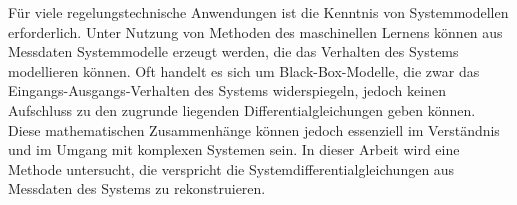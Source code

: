 Für viele regelungstechnische Anwendungen ist die Kenntnis von Systemmodellen erforderlich. Unter Nutzung von Methoden des maschinellen Lernens können aus Messdaten Systemmodelle erzeugt werden, die das Verhalten des Systems modellieren können. Oft handelt es sich um Black-Box-Modelle, die zwar das Eingangs-Ausgangs-Verhalten des Systems widerspiegeln, jedoch keinen Aufschluss zu den zugrunde liegenden Differentialgleichungen geben können. Diese mathematischen Zusammenhänge können jedoch essenziell im Verständnis und im Umgang mit komplexen Systemen sein. In dieser Arbeit wird eine Methode untersucht, die verspricht die Systemdifferentialgleichungen aus Messdaten des Systems zu rekonstruieren. 